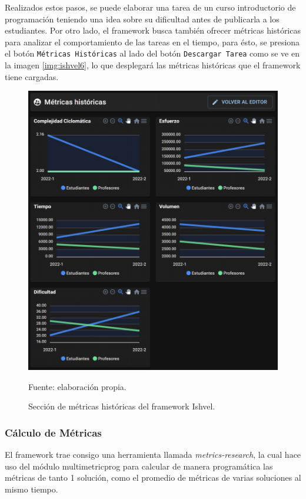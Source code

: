 \documentclass[letterpaper,12pt]{article}
\begin{document}
Realizados estos pasos, se puede elaborar una tarea de un curso introductorio de programación teniendo una idea sobre su dificultad antes de publicarla a los estudiantes. Por otro lado, el framework busca también ofrecer métricas históricas para analizar el comportamiento de las tareas en el tiempo, para ésto, se presiona el botón \texttt{Métricas Históricas} al lado del botón \texttt{Descargar Tarea} como se ve en la imagen \ref{img:ishvel6}, lo que desplegará las métricas históricas que el framework tiene cargadas.

\begin{figure}[H]
  \centering
  \includegraphics[width=1\textwidth]{figures/ishvel7.png}
  \caption{Sección de métricas históricas del framework Ishvel.} Fuente: elaboración propia.
  \label{img:ishvel7}
\end{figure}

\subsubsection{Cálculo de Métricas} \label{sssec:metricsCalc}

El framework trae consigo una herramienta llamada \textit{metrics-research}, la cual hace uso del módulo multimetricprog \cite{privkweihmann_multimetricprog} para calcular de manera programática las métricas de tanto 1 solución, como el promedio de métricas de varias soluciones al mismo tiempo.
\end{document}
